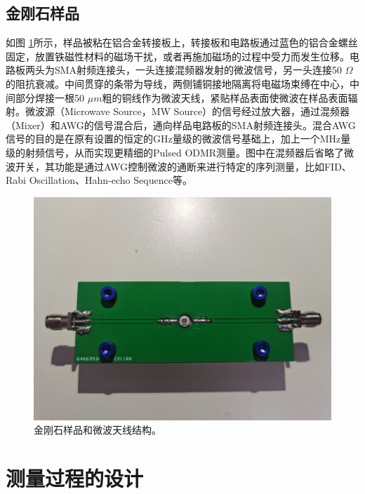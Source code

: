 \documentclass[type = bachelor]{whu-thesis}
\begin{document}
\subsection{金刚石样品}
如图 \ref{fig: Sample}所示，样品被粘在铝合金转接板上，转接板和电路板通过蓝色的铝合金螺丝固定，放置铁磁性材料的磁场干扰，或者再施加磁场的过程中受力而发生位移。电路板两头为SMA射频连接头，一头连接混频器发射的微波信号，另一头连接50 $\Omega$的阻抗衰减。中间贯穿的条带为导线，两侧铺铜接地隔离将电磁场束缚在中心，中间部分焊接一根50 $\mu m$粗的铜线作为微波天线，紧贴样品表面使微波在样品表面辐射。微波源（Microwave Source，MW Source）的信号经过放大器，通过混频器（Mixer）和AWG的信号混合后，通向样品电路板的SMA射频连接头。混合AWG信号的目的是在原有设置的恒定的GHz量级的微波信号基础上，加上一个MHz量级的射频信号，从而实现更精细的Pulsed ODMR测量。图中在混频器后省略了微波开关，其功能是通过AWG控制微波的通断来进行特定的序列测量，比如FID、Rabi Oscillation、Hahn-echo Sequence等。
\begin{figure}
  \centering
  \includegraphics[width=1.0\textwidth]{figures/Chapter 1/Sample.jpg}
  \caption[金刚石样品和微波天线结构]{金刚石样品和微波天线结构。}
  \label{fig: Sample}
\end{figure}

\section{测量过程的设计}
\end{document}
